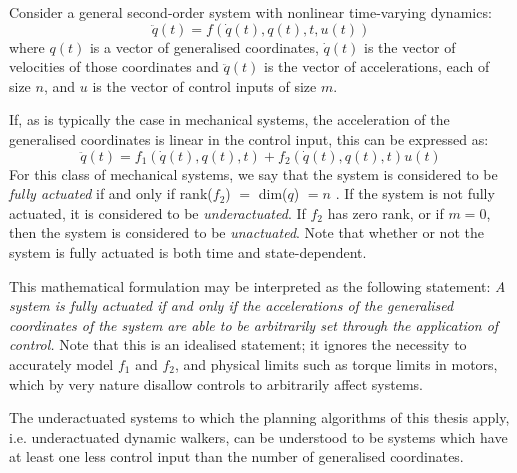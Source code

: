 Consider a general second-order system with nonlinear time-varying dynamics:
\[ \ddot{q}(t) = f\left(\dot{q}(t), q(t), t, u(t)\right) \]
where $q(t)$ is a vector of generalised coordinates, $\dot{q}(t)$ is the vector of velocities of those coordinates and $\ddot{q}(t)$ is the vector of accelerations, each of size $n$, and $u$ is the vector of control inputs of size $m$. 

If, as is typically the case in mechanical systems, the acceleration of the generalised coordinates is linear in the control input, this can be expressed as:
\[ \ddot{q}(t) = f_1\left(\dot{q}(t), q(t), t\right) + f_2\left(\dot{q}(t), q(t), t\right)u(t) \]
For this class of mechanical systems, we say that the system is considered to be \textit{fully actuated} if and only if rank($f_2$) $=$ dim($q$) $= n$ \cite{??}. If the system is not fully actuated, it is considered to be \textit{underactuated}. If $f_2$ has zero rank, or if $m=0$, then the system is considered to be \textit{unactuated}. Note that whether or not the system is fully actuated is both time and state-dependent.  

This mathematical formulation may be interpreted as the following statement:
\textit{A system is fully actuated if and only if the accelerations of the generalised coordinates of the system are able to be arbitrarily set through the application of control.} Note that this is an idealised statement; it ignores the necessity to accurately model $f_1$ and $f_2$, and physical limits such as torque limits in motors, which by very nature disallow controls to arbitrarily affect systems. 

The underactuated systems to which the planning algorithms of this thesis apply, i.e. underactuated dynamic walkers, can be understood to be systems which have at least one less control input than the number of generalised coordinates.